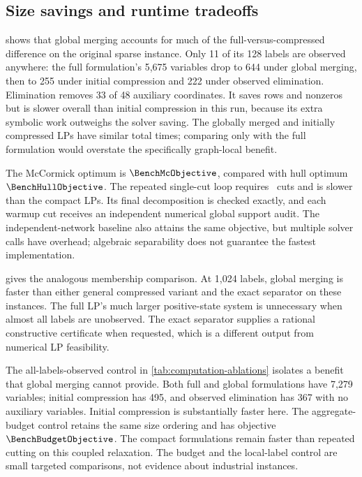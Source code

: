 \subsection{Size savings and runtime tradeoffs}





 shows that global merging accounts for much
of the full-versus-compressed difference on the original sparse instance.
Only 11 of its 128 labels are observed anywhere: the full formulation's
5,675 variables drop to 644 under global merging, then to 255 under initial
compression and 222 under observed elimination. Elimination removes 33 of
48 auxiliary coordinates. It saves rows and nonzeros but is slower overall
than initial compression in this run, because its extra symbolic work
outweighs the solver saving. The globally merged and initially compressed
LPs have similar total times; comparing only with the full formulation
would overstate the specifically graph-local benefit.

The McCormick optimum is $\BenchMcObjective$, compared with hull optimum
$\BenchHullObjective$. The repeated single-cut loop requires
\BenchCutCount\ cuts and is slower than the compact LPs. Its final
decomposition is checked exactly, and each warmup cut receives an independent
numerical global support audit. The independent-network baseline also attains
the same objective, but multiple solver calls have overhead; algebraic
separability does not guarantee the fastest implementation.

 gives the analogous membership comparison.
At 1,024 labels, global merging is faster than either general compressed
variant and the exact separator on these instances. The full LP's much
larger positive-state system is unnecessary when almost all labels are
unobserved. The exact separator supplies a rational constructive certificate
when requested, which is a different output from numerical LP feasibility.

The all-labels-observed control in \cref{tab:computation-ablations}
isolates a benefit that global merging cannot provide. Both full and global
formulations have 7,279 variables; initial compression has 495, and observed
elimination has 367 with no auxiliary variables. Initial compression is
substantially faster here. The aggregate-budget control retains the same
size ordering and has objective $\BenchBudgetObjective$. The compact
formulations remain faster than repeated cutting on this coupled relaxation.
The budget and the local-label control are small targeted comparisons, not
evidence about industrial instances.

